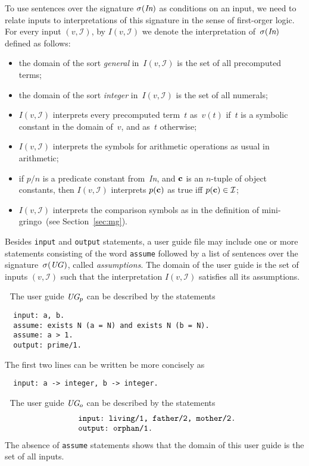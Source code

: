 \documentclass{article}
\def\beq{\begin{equation}}
\def\eeq#1{\label{#1}\end{equation}}
\def\ba{\begin{array}}
\def\ea{\end{array}}
\def\gringo{{\sc gringo}}
\newcommand{\I}{\mathcal{I}}
\begin{document}
{To use sentences over the signature $\sigma(\emph{In})$ as conditions
on an input, we need to relate inputs to interpretations of this
signature in the sense of first-orger logic.  For every input $(v,\I)$, by
$I(v,\I)$ we denote the interpretation of~$\sigma(\emph{In})$
defined as follows:
\begin{itemize}
\item
the domain of the sort \emph{general} in~$I(v,\I)$
  is the set of all precomputed terms;
\item
the domain of the sort \emph{integer} in~$I(v,\I)$ is the set of all numerals;
\item $I(v,\I)$ interprets every precomputed term~$t$ as~$v(t)$ if~$t$
  is a symbolic constant in the domain of~$v$, and as~$t$ otherwise;
\item $I(v,\I)$ interprets the symbols for arithmetic operations
  as usual in arithmetic;
\item if $p/n$ is a predicate constant from~\emph{In}, and $\bf c$
  is an $n$-tuple of object constants, then $I(v,\I)$ interprets
  $p({\bf c})$ as true iff $p({\bf c})\in\I$;
\item $I(v,\I)$ interprets the comparison symbols as in the definition of
  mini-\gringo\ (see Section~\ref{sec:mg}).
\end{itemize}

Besides \verb|input| and \verb|output| statements, a user guide
file may include one or more statements consisting of the word
\verb|assume| followed by a list of sentences over the
signature~$\sigma(\emph{UG\/})$, called \emph{assumptions}.
The domain of the user guide is the set of inputs $(v,\I)$ such that
the interpretation $I(v,\I)$ satisfies all its assumptions.

\medskip{}$\;$ The user guide $\emph{UG}_p$
can be described by the statements
\begin{verbatim}
  input: a, b.
  assume: exists N (a = N) and exists N (b = N).
  assume: a > 1.
  output: prime/1.
\end{verbatim}
The first two lines can be written be more concisely as
\begin{verbatim}
  input: a -> integer, b -> integer.
\end{verbatim}

\medskip{}$\;$ The user guide $\emph{UG}_o$
can be described by the statements
\beq\ba l
\verb| input: living/1, father/2, mother/2.|\\
\verb| output: orphan/1.|
\ea\eeq{ugo}
The absence of \verb|assume| statements shows that the domain of this
user guide is the set of all inputs.

}
\end{document}
